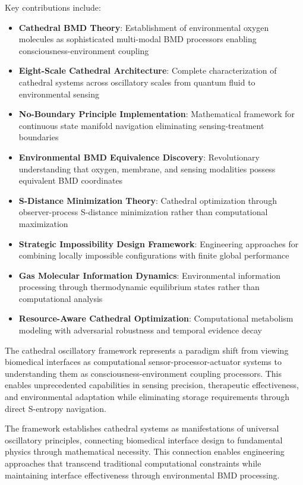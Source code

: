 \documentclass[12pt,a4paper]{article}
\begin{document}
Key contributions include:

\begin{itemize}
\item \textbf{Cathedral BMD Theory}: Establishment of environmental oxygen molecules as sophisticated multi-modal BMD processors enabling consciousness-environment coupling
\item \textbf{Eight-Scale Cathedral Architecture}: Complete characterization of cathedral systems across oscillatory scales from quantum fluid to environmental sensing
\item \textbf{No-Boundary Principle Implementation}: Mathematical framework for continuous state manifold navigation eliminating sensing-treatment boundaries
\item \textbf{Environmental BMD Equivalence Discovery}: Revolutionary understanding that oxygen, membrane, and sensing modalities possess equivalent BMD coordinates
\item \textbf{S-Distance Minimization Theory}: Cathedral optimization through observer-process S-distance minimization rather than computational maximization
\item \textbf{Strategic Impossibility Design Framework}: Engineering approaches for combining locally impossible configurations with finite global performance
\item \textbf{Gas Molecular Information Dynamics}: Environmental information processing through thermodynamic equilibrium states rather than computational analysis
\item \textbf{Resource-Aware Cathedral Optimization}: Computational metabolism modeling with adversarial robustness and temporal evidence decay
\end{itemize}

The cathedral oscillatory framework represents a paradigm shift from viewing biomedical interfaces as computational sensor-processor-actuator systems to understanding them as consciousness-environment coupling processors. This enables unprecedented capabilities in sensing precision, therapeutic effectiveness, and environmental adaptation while eliminating storage requirements through direct S-entropy navigation.

The framework establishes cathedral systems as manifestations of universal oscillatory principles, connecting biomedical interface design to fundamental physics through mathematical necessity. This connection enables engineering approaches that transcend traditional computational constraints while maintaining interface effectiveness through environmental BMD processing.
\end{document}
